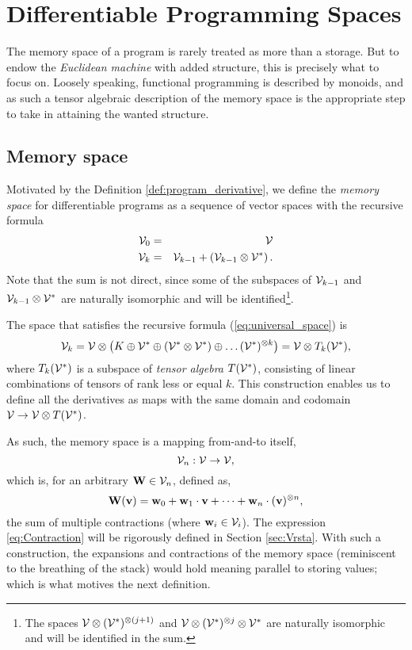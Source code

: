 \section{Differentiable Programming Spaces}

The memory space of a program is rarely treated as more than a storage. But to endow the \emph{Euclidean machine} with added structure, this is precisely what to focus on. Loosely speaking, functional programming is described by monoids, and as such a tensor algebraic description of the memory space is the appropriate step to take in attaining the wanted structure.

\subsection{Memory space}

Motivated by the Definition
\ref{def:program_derivative}, we define
the \emph{memory space} for differentiable programs  as a sequence of vector spaces with
the recursive formula
\begin{eqnarray}
  \mathcal{V}_0 &=& \mathcal{V}\\
  \label{eq:universal_space}
  \mathcal{V}_k &=& \mathcal{V}_{k-1}+\left(\mathcal{V}_{k-1}\otimes \mathcal{V}^*\right).
\end{eqnarray}
Note that the sum is not direct, since some of the subspaces of $\mathcal{V}_{k-1}$ and
$\mathcal{V}_{k-1}\otimes \mathcal{V}^*$ are naturally isomorphic and will be
identified\footnote{The spaces $\mathcal{V}\otimes(\mathcal{V}^*)^{\otimes (j+1)}$ and
  $\mathcal{V}\otimes (\mathcal{V}^*)^{\otimes j}\otimes \mathcal{V}^*$ are naturally isomorphic and
  will be identified in the sum.
}.

  The space that satisfies the recursive formula (\ref{eq:universal_space}) is
  \begin{equation}
    \label{eq:k-th-virtual-space}
    \mathcal{V}_k = \mathcal{V}\otimes \left(K\oplus \mathcal{V}^* \oplus (\mathcal{V}^*\otimes \mathcal{V}^*)\oplus\ldots
      (\mathcal{V}^*)^{\otimes k}\right) = \mathcal{V}\otimes T_k(\mathcal{V}^*),
  \end{equation}
  where $T_k(\mathcal{V}^*)$ is a subspace of \emph{tensor algebra} $T(\mathcal{V}^*)$, consisting of
  linear combinations of tensors of rank less or equal $k$. This construction
  enables us to define all the derivatives as maps with 
  the same domain and codomain $\mathcal{V}\to \mathcal{V}\otimes T(\mathcal{V}^*)$.

  As such, the memory space is a mapping from-and-to itself,
\begin{equation}
\mathcal{V}_n:\mathcal{V}\to\mathcal{V},
\end{equation}
which is, for an arbitrary $\mathbf{W}\in\mathcal{V}_n$, defined as, 
\begin{equation}
\mathbf{W}(\mathbf{v})=\mathbf{w}_0+\mathbf{w}_1\cdot\mathbf{v}+\cdots+\mathbf{w}_n\cdot(\mathbf{v})^{\otimes n}\label{eq:Contraction},
\end{equation}
the sum of multiple contractions (where $\mathbf{w}_i\in\mathcal{V}_i$). The expression \eqref{eq:Contraction} will be rigorously defined in Section \ref{sec:Vrsta}. With such a construction, the expansions and contractions of the memory space (reminiscent to the breathing of the stack) would hold meaning parallel to storing values; which is what motives the next definition.

